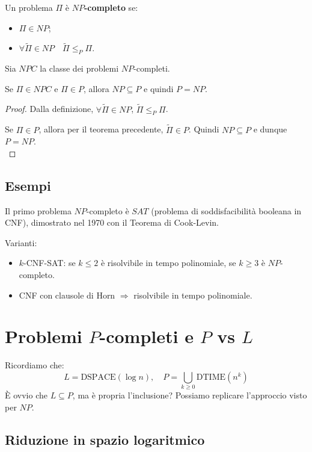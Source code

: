 Un problema $ \Pi $ è \textbf{$NP$-completo} se:
\begin{itemize}
    \item $\Pi \in NP$;
    \item $\forall \widetilde{\Pi} \in NP \quad \widetilde{\Pi} \leq_P \Pi$.
\end{itemize}

Sia $NPC$ la classe dei problemi $NP$-completi. \\

\begin{theor}
Se $\Pi \in NPC$ e $\Pi \in P$, allora $NP \subseteq P$ e quindi $P = NP$.
\end{theor}

\begin{proof}
Dalla definizione, $\forall \widetilde{\Pi} \in NP$, $\widetilde{\Pi} \leq_P \Pi$.

Se $\Pi \in P$, allora per il teorema precedente, $\widetilde{\Pi} \in P$. Quindi $NP \subseteq P$ e dunque $P = NP$. \\
\end{proof}

\vspace{-0.3cm}

\subsection*{Esempi}

Il primo problema $NP$-completo è $SAT$ (problema di soddisfacibilità booleana in CNF), dimostrato nel 1970 con il Teorema di Cook-Levin.

Varianti:
\begin{itemize}
    \item $k$-CNF-SAT: se $k \leq 2$ è risolvibile in tempo polinomiale, se $k \geq 3$ è $NP$-completo.
    \item CNF con clausole di Horn $\Rightarrow$ risolvibile in tempo polinomiale.
\end{itemize}

\section*{Problemi $P$-completi e $P$ vs $L$}

Ricordiamo che:
\[
L = \text{DSPACE}(\log n), \quad P = \bigcup_{k \geq 0} \text{DTIME}(n^k)
\]
È ovvio che $L \subseteq P$, ma è propria l'inclusione? Possiamo replicare l'approccio visto per $NP$.

\subsection*{Riduzione in spazio logaritmico}

